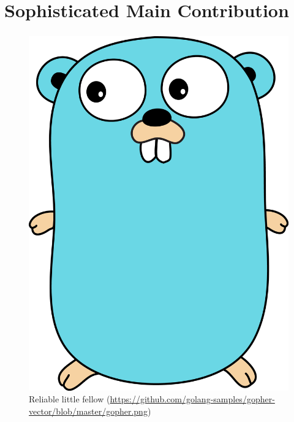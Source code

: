 \section{Sophisticated Main Contribution}

\begin{frame}
    \frametitle{\insertsection}
    \begin{figure}
        \centering
        \includegraphics[width=.4\linewidth]{./img/gopher.png}
        \caption{Reliable little fellow (\url{https://github.com/golang-samples/gopher-vector/blob/master/gopher.png})}
    \end{figure}
\end{frame}
